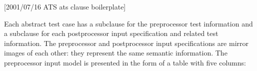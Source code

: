 [2001/07/16 ATS ats clause boilerplate]

    Each abstract test case has a subclause for the preprocessor
test information and a subclause for each postprocessor
input specification and related test information.
The preprocessor and postprocessor input specifications
are mirror images of each other: they represent the same
semantic information. The preprocessor input model is presented
in the form of a table with five columns:
